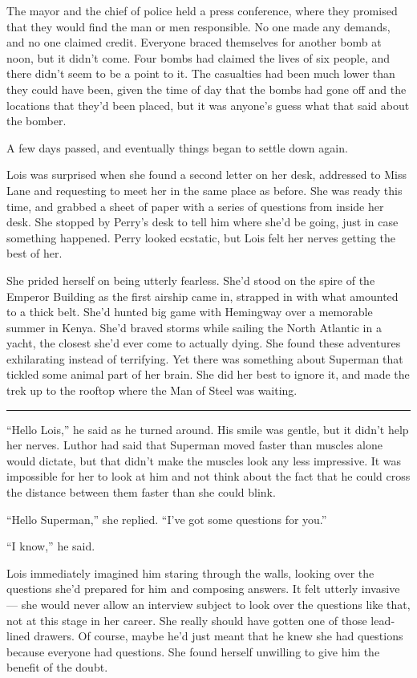 The mayor and the chief of police held a press conference, where they
promised that they would find the man or men responsible. No one made
any demands, and no one claimed credit. Everyone braced themselves for
another bomb at noon, but it didn't come. Four bombs had claimed the
lives of six people, and there didn't seem to be a point to it. The
casualties had been much lower than they could have been, given the time
of day that the bombs had gone off and the locations that they'd been
placed, but it was anyone's guess what that said about the bomber.

A few days passed, and eventually things began to settle down again.

Lois was surprised when she found a second letter on her desk, addressed
to Miss Lane and requesting to meet her in the same place as before. She
was ready this time, and grabbed a sheet of paper with a series of
questions from inside her desk. She stopped by Perry's desk to tell him
where she'd be going, just in case something happened. Perry looked
ecstatic, but Lois felt her nerves getting the best of her.

She prided herself on being utterly fearless. She'd stood on the spire
of the Emperor Building as the first airship came in, strapped in with
what amounted to a thick belt. She'd hunted big game with Hemingway over
a memorable summer in Kenya. She'd braved storms while sailing the North
Atlantic in a yacht, the closest she'd ever come to actually dying. She
found these adventures exhilarating instead of terrifying. Yet there was
something about Superman that tickled some animal part of her brain. She
did her best to ignore it, and made the trek up to the rooftop where the
Man of Steel was waiting.

\begin{center}\rule{0.5\linewidth}{0.5pt}\end{center}

``Hello Lois,'' he said as he turned around. His smile was gentle, but
it didn't help her nerves. Luthor had said that Superman moved faster
than muscles alone would dictate, but that didn't make the muscles look
any less impressive. It was impossible for her to look at him and not
think about the fact that he could cross the distance between them
faster than she could blink.

``Hello Superman,'' she replied. ``I've got some questions for you.''

``I know,'' he said.

Lois immediately imagined him staring through the walls, looking over
the questions she'd prepared for him and composing answers. It felt
utterly invasive --- she would never allow an interview subject to look
over the questions like that, not at this stage in her career. She
really should have gotten one of those lead‐lined drawers. Of course,
maybe he'd just meant that he knew she had questions because everyone
had questions. She found herself unwilling to give him the benefit of
the doubt.

